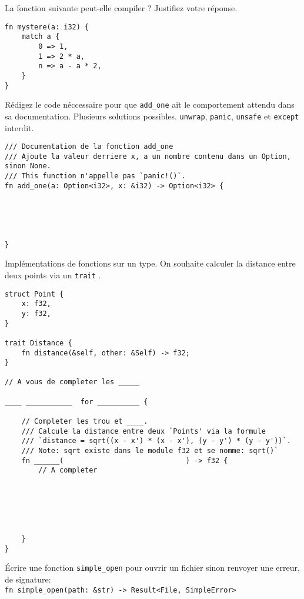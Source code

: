 \documentclass[11pt,a4paper,addpoint]{exam}
\begin{document}
\begin{questions}
\question[1] La fonction suivante peut-elle compiler ? Justifiez votre réponse.
\begin{verbatim}
fn mystere(a: i32) {
    match a {
        0 => 1,
        1 => 2 * a,
        n => a - a * 2,
    }
}
\end{verbatim}
\vspace{1in}
\pagebreak

\question[1] Rédigez le code néccessaire pour que \texttt{add\_one} ait le comportement attendu dans sa documentation. Plusieurs solutions possibles.
\texttt{unwrap}, \texttt{panic}, \texttt{unsafe} et \texttt{except} interdit.
\begin{verbatim}
/// Documentation de la fonction add_one
/// Ajoute la valeur derriere x, a un nombre contenu dans un Option, sinon None.
/// This function n'appelle pas `panic!()`.
fn add_one(a: Option<i32>, x: &i32) -> Option<i32> {





}
\end{verbatim}

\question[1] Implémentations de fonctions sur un type. On souhaite calculer
la distance entre deux points via un \texttt{trait} .

\begin{verbatim}
struct Point {
    x: f32,
    y: f32,
}

trait Distance {
    fn distance(&self, other: &Self) -> f32;
}

// A vous de completer les _____

____ ___________  for __________ {

    // Completer les trou et ____.
    /// Calcule la distance entre deux `Points' via la formule
    /// `distance = sqrt((x - x') * (x - x'), (y - y') * (y - y'))`.
    /// Note: sqrt existe dans le module f32 et se nomme: sqrt()`
    fn ______(                             ) -> f32 {
        // A completer






    }
}
\end{verbatim}

\question[1] Écrire une fonction \texttt{simple_open} pour ouvrir un fichier sinon renvoyer une erreur, de signature:\\
\texttt{fn simple_open(path: &str) -> Result<File, SimpleError>}



\end{questions}
\end{document}
